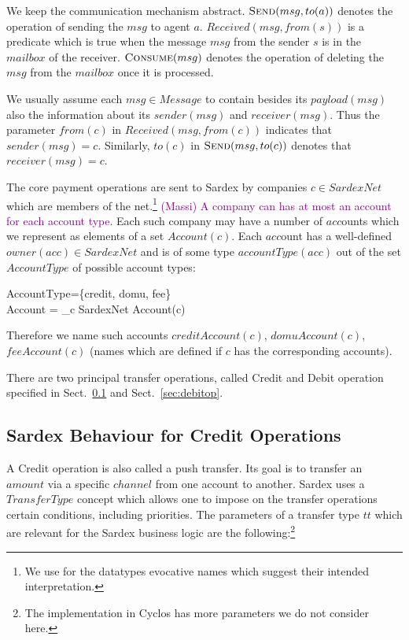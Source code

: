 We keep the communication mechanism abstract. $\hbox{\sc Send}(msg,to(a))$ denotes the operation of sending the $msg$ to agent $a$. 
$Received(msg,from(s))$ is a predicate which is true when the message $msg$ from the sender $s$ is in the $mailbox$ of the receiver. $\hbox{\sc Consume}(msg)$ denotes the operation of deleting the $msg$ from the $mailbox$ once it is processed. 

We usually assume  each $msg \in Message$ to contain besides its $payload(msg)$ also the information about its $sender(msg)$ and $receiver(msg)$. Thus the parameter $from(c)$ in $Received(msg, from(c))$ indicates that $sender(msg)=c$. Similarly, $to(c)$ in $\hbox{\sc Send}(msg, to(c))$ denotes that $receiver(msg) = c$.

The core payment operations are sent to Sardex by companies $c \in SardexNet$ which are members of the net.\footnote{We use for the datatypes evocative names which suggest their intended interpretation.} \textcolor{purple}{(Massi) A company can has at most an account for each account type.} Each such company may have a number of $acc$ounts which we represent as elements of a set $Account(c)$. Each $acc$ount has a well-defined $owner(acc) \in SardexNet$ and is of some type $accountType(acc)$ out of the set $AccountType$ of possible account types:

\begin{asm}
AccountType=\{credit, domu, fee\} \\
Account = \bigcup_{c \in SardexNet} Account(c)
\end{asm}
Therefore we name such accounts $creditAccount(c)$, $domuAccount(c)$, $feeAccount(c)$ (names which are defined if $c$ has the corresponding accounts). 

There are two principal transfer operations, called Credit and Debit operation specified in Sect.~\ref{sec:creditop} and Sect.~\ref{sec:debitop}.

\subsection{Sardex Behaviour for Credit Operations}
\label{sec:creditop}

A Credit operation is also called a push transfer. Its goal is to transfer an $amount$ via a specific $channel$ from one account to another. Sardex uses a $TransferType$ concept which allows one to impose on the transfer operations certain conditions, including priorities. The parameters of a transfer type $tt$ which are relevant for the Sardex business logic are the following:\footnote{The implementation in Cyclos has more parameters we do not consider here.}

